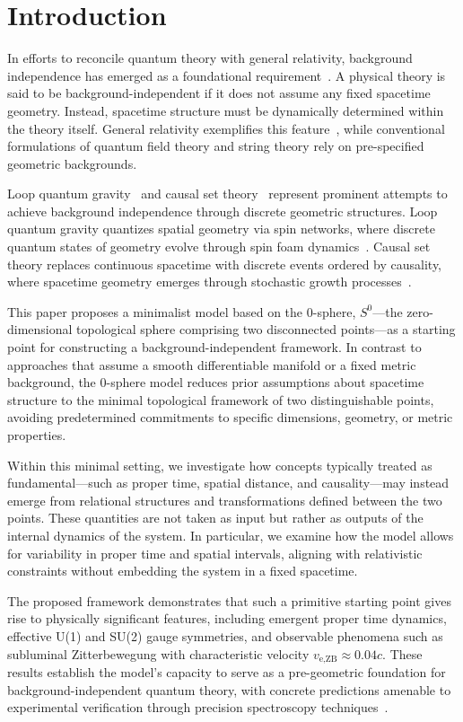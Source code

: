 \documentclass[%
 reprint,
 amsmath,amssymb,
 aps,
]{revtex4-1}
\numberwithin{equation}{section}%
\begin{document}
\section{Introduction}
\label{sec:introduction}

In efforts to reconcile quantum theory with general relativity, background independence has emerged as a foundational requirement~\cite{smolin2006}. A physical theory is said to be background-independent if it does not assume any fixed spacetime geometry. Instead, spacetime structure must be dynamically determined within the theory itself. General relativity exemplifies this feature~\cite{einstein1916}, while conventional formulations of quantum field theory and string theory rely on pre-specified geometric backgrounds.

Loop quantum gravity~\cite{thiemann2007, rovelli2004} and causal set theory~\cite{surya2019, rideout2000} represent prominent attempts to achieve background independence through discrete geometric structures. Loop quantum gravity quantizes spatial geometry via spin networks, where discrete quantum states of geometry evolve through spin foam dynamics~\cite{rovelli1995}. Causal set theory replaces continuous spacetime with discrete events ordered by causality, where spacetime geometry emerges through stochastic growth processes~\cite{bombelli1987}.

This paper proposes a minimalist model based on the 0-sphere, $S^0$—the zero-dimensional topological sphere comprising two disconnected points—as a starting point for constructing a background-independent framework. In contrast to approaches that assume a smooth differentiable manifold or a fixed metric background, the 0-sphere model reduces prior assumptions about spacetime structure to the minimal topological framework of two distinguishable points, avoiding predetermined commitments to specific dimensions, geometry, or metric properties.

Within this minimal setting, we investigate how concepts typically treated as fundamental—such as proper time, spatial distance, and causality—may instead emerge from relational structures and transformations defined between the two points. These quantities are not taken as input but rather as outputs of the internal dynamics of the system. In particular, we examine how the model allows for variability in proper time and spatial intervals, aligning with relativistic constraints without embedding the system in a fixed spacetime.

The proposed framework demonstrates that such a primitive starting point gives rise to physically significant features, including emergent proper time dynamics, effective U(1) and SU(2) gauge symmetries, and observable phenomena such as subluminal Zitterbewegung with characteristic velocity $v_{\text{e,ZB}} \approx 0.04c$. These results establish the model's capacity to serve as a pre-geometric foundation for background-independent quantum theory, with concrete predictions amenable to experimental verification through precision spectroscopy techniques~\cite{fan2023}.
\end{document}
